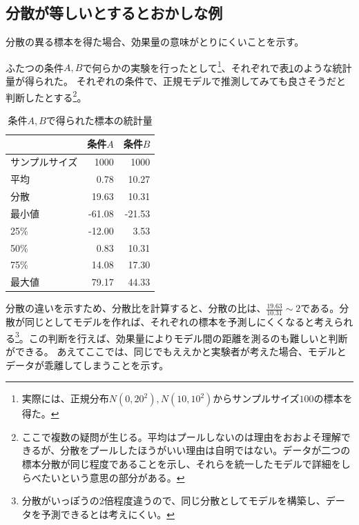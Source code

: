 \subsection{分散が等しいとするとおかしな例}
分散の異る標本を得た場合、効果量の意味がとりにくいことを示す。

ふたつの条件$A,B$で何らかの実験を行ったとして\footnote{実際には、正規分布$N(0,20^2),N(10,10^2)$からサンプルサイズ$100$の標本を得た。}、それぞれで表\ref{table:cohen_d_pooled_std_model}のような統計量が得られた。
それぞれの条件で、正規モデルで推測してみても良さそうだと判断したとする\footnote{ここで複数の疑問が生じる。平均はプールしないのは理由をおおよそ理解できるが、分散をプールしたほうがいい理由は自明ではない。データが二つの標本分散が同じ程度であることを示し、それらを統一したモデルで詳細をしらべたいという意思の部分がある。}。

\begin{table}[hbtp]
 \caption{条件$A,B$で得られた標本の統計量}
 \label{table:cohen_d_pooled_std_model}
 \centering
\begin{tabular}{lrr}
\hline
{} &   条件$A$ &   条件$B$ \\
\hline
サンプルサイズ & 1000 & 1000 \\
平均  &    0.78 &   10.27 \\
分散   &   19.63 &   10.31 \\
最小値   &  -61.08 &  -21.53 \\
25\%   &  -12.00 &    3.53 \\
50\%   &    0.83 &   10.31 \\
75\%   &   14.08 &   17.30 \\
最大値   &   79.17 &   44.33 \\
\hline
\end{tabular}
\end{table}


分散の違いを示すため、分散比を計算すると、分散の比は、$\frac{19.63}{10.31}\sim 2$である。分散が同じとしてモデルを作れば、それぞれの標本を予測しにくくなると考えられる\footnote{分散がいっぽうの$2$倍程度違うので、同じ分散としてモデルを構築し、データを予測できるとは考えにくい。}。この判断を行えば、効果量によりモデル間の距離を測るのも難しいと判断ができる。
あえてここでは、同じでもええかと実験者が考えた場合、モデルとデータが乖離してしまうことを示す。

